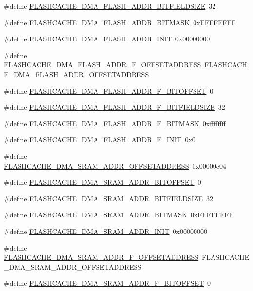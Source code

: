 \begin{DoxyCompactItemize}
\item 
\#define \hyperlink{a00550_a174846e78c1fbe343cbfe4b0b552ede1}{FLASHCACHE\_\-DMA\_\-FLASH\_\-ADDR\_\-BITFIELDSIZE}~32
\item 
\#define \hyperlink{a00550_ae3c62ecfcc668a5b652321ec841dfa9e}{FLASHCACHE\_\-DMA\_\-FLASH\_\-ADDR\_\-BITMASK}~0xFFFFFFFF
\item 
\#define \hyperlink{a00550_a4f2a185d8fab306508571cc43d0e613b}{FLASHCACHE\_\-DMA\_\-FLASH\_\-ADDR\_\-INIT}~0x00000000
\item 
\#define \hyperlink{a00550_abde21b42d86862fb7b395a37c09574c9}{FLASHCACHE\_\-DMA\_\-FLASH\_\-ADDR\_\-F\_\-OFFSETADDRESS}~FLASHCACHE\_\-DMA\_\-FLASH\_\-ADDR\_\-OFFSETADDRESS
\item 
\#define \hyperlink{a00550_a57395db7fda3b74733262ddf6ea05865}{FLASHCACHE\_\-DMA\_\-FLASH\_\-ADDR\_\-F\_\-BITOFFSET}~0
\item 
\#define \hyperlink{a00550_a85d0423bfbb3a7a2967b0c6b179cb580}{FLASHCACHE\_\-DMA\_\-FLASH\_\-ADDR\_\-F\_\-BITFIELDSIZE}~32
\item 
\#define \hyperlink{a00550_a973b4f0eca1de0d074d8ffde376f2337}{FLASHCACHE\_\-DMA\_\-FLASH\_\-ADDR\_\-F\_\-BITMASK}~0xffffffff
\item 
\#define \hyperlink{a00550_ac231695590c9817909ad2770bd5bc824}{FLASHCACHE\_\-DMA\_\-FLASH\_\-ADDR\_\-F\_\-INIT}~0x0
\item 
\#define \hyperlink{a00550_ab27efdb9a0b44bdb1275b91fff2afa1f}{FLASHCACHE\_\-DMA\_\-SRAM\_\-ADDR\_\-OFFSETADDRESS}~0x00000c04
\item 
\#define \hyperlink{a00550_ab828444783cba2b3791ef9ac90175fa9}{FLASHCACHE\_\-DMA\_\-SRAM\_\-ADDR\_\-BITOFFSET}~0
\item 
\#define \hyperlink{a00550_a6a47a926f561dfed0a18639966677f2b}{FLASHCACHE\_\-DMA\_\-SRAM\_\-ADDR\_\-BITFIELDSIZE}~32
\item 
\#define \hyperlink{a00550_a927673eb59d8d28a721a4fb018cce7c3}{FLASHCACHE\_\-DMA\_\-SRAM\_\-ADDR\_\-BITMASK}~0xFFFFFFFF
\item 
\#define \hyperlink{a00550_a604901f70619966adfa1f914fdab4220}{FLASHCACHE\_\-DMA\_\-SRAM\_\-ADDR\_\-INIT}~0x00000000
\item 
\#define \hyperlink{a00550_a6c57cd84cec2069b08c4ed370ce8a302}{FLASHCACHE\_\-DMA\_\-SRAM\_\-ADDR\_\-F\_\-OFFSETADDRESS}~FLASHCACHE\_\-DMA\_\-SRAM\_\-ADDR\_\-OFFSETADDRESS
\item 
\#define \hyperlink{a00550_a0ac564a3bf49332c59b74caaf6e2a72d}{FLASHCACHE\_\-DMA\_\-SRAM\_\-ADDR\_\-F\_\-BITOFFSET}~0
\item 

\end{DoxyCompactItemize}
